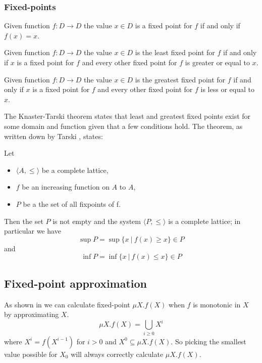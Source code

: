 \subsubsection{Fixed-points}
\begin{definition}
	Given function $f : D \rightarrow D$ the value $x \in D$ is a fixed point for $f$ if and only if $f(x) = x$.
\end{definition}
\begin{definition}
	Given function $f : D \rightarrow D$ the value $x \in D$ is the least fixed point for $f$ if and only if $x$ is a fixed point for $f$ and every other fixed point for $f$ is greater or equal to $x$.
\end{definition}
\begin{definition}
	Given function $f : D \rightarrow D$ the value $x \in D$ is the greatest fixed point for $f$ if and only if $x$ is a fixed point for $f$ and every other fixed point for $f$ is less or equal to $x$.
\end{definition}
The Knaster-Tarski theorem states that least and greatest fixed points exist for some domain and function given that a few conditions hold.
The theorem, as written down by Tarski \cite{tarski1955}, states:
\begin{theorem}
	\label{the_knaster_tarski}
	Let
	\begin{itemize}
		\item $\langle A, \leq \rangle$ be a complete lattice,
		\item $f$ be an increasing function on $A$ to $A$,
		\item $P$ be a the set of all fixpoints of f.
	\end{itemize}
	Then the set $P$ is not empty and the system $\langle P, \leq \rangle$ is a complete lattice; in particular we have 
	\[ \sup P = \sup \{ x\ |\ f(x) \geq x \} \in P \]
	and
	\[ \inf P = \inf \{ x\ |\ f(x) \leq x \} \in P \]
\end{theorem}

\subsection{Fixed-point approximation}
As shown in \cite{Emerson:1986:MCP:900378} we can calculate fixed-point $\mu X.f(X)$ when $f$ is monotonic in $X$ by approximating $X$.
\[ \mu X.f(X) = \bigcup_{i \geq 0} X^i \]
where $X^i = f(X^{i-1})$ for $i > 0$ and $X^0 \subseteq \mu X.f(X)$. So picking the smallest value possible for $X_0$ will always correctly calculate $\mu X. f(X)$.

